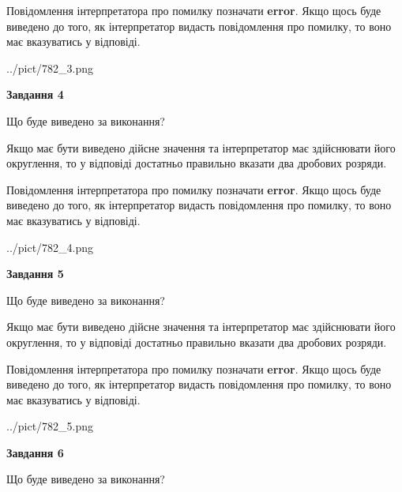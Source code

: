 \documentclass[12pt, ukrainian]{article}
\begin{document}
{\begin {Large}
Повідомлення інтерпретатора про помилку позначати \textbf{error}.
Якщо щось буде виведено до того, як інтерпретатор видасть повідомлення про помилку, 
то воно має вказуватись у відповіді. \par

\begin{center}
	{../pict/782_3.png}
\end{center}
\newpage

{\begin {center}\textbf{Завдання 4}\end {center}}\par
Що буде виведено за виконання? \par

Якщо має бути виведено дійсне значення та інтерпретатор має здійснювати його округлення, 
то у відповіді достатньо правильно вказати два дробових розряди.

Повідомлення інтерпретатора про помилку позначати \textbf{error}.
Якщо щось буде виведено до того, як інтерпретатор видасть повідомлення про помилку, 
то воно має вказуватись у відповіді. \par

\begin{center}
	{../pict/782_4.png}
\end{center}
\newpage

{\begin {center}\textbf{Завдання 5}\end {center}}\par
Що буде виведено за виконання? \par

Якщо має бути виведено дійсне значення та інтерпретатор має здійснювати його округлення, 
то у відповіді достатньо правильно вказати два дробових розряди.

Повідомлення інтерпретатора про помилку позначати \textbf{error}.
Якщо щось буде виведено до того, як інтерпретатор видасть повідомлення про помилку, 
то воно має вказуватись у відповіді. \par

\begin{center}
	{../pict/782_5.png}
\end{center}
\newpage

{\begin {center}\textbf{Завдання 6}\end {center}}\par
Що буде виведено за виконання? \par


\end{Large}}
\end{document}
